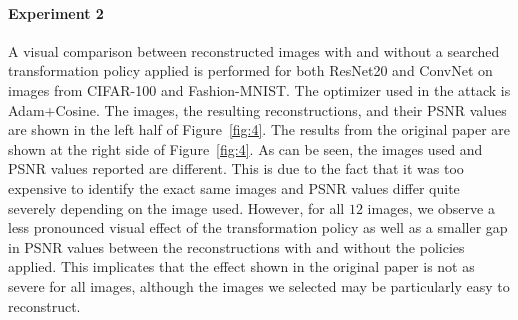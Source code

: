 \paragraph{Experiment 2} A visual comparison between reconstructed images with and without a searched transformation policy applied is performed for both ResNet20 and ConvNet on images from CIFAR-100 and Fashion-MNIST. The optimizer used in the attack is Adam+Cosine. The images, the resulting reconstructions, and their PSNR values are shown in the left half of Figure~\ref{fig:4}. The results from the original paper are shown at the right side of Figure~\ref{fig:4}. As can be seen, the images used and PSNR values reported are different. This is due to the fact that it was too expensive to identify the exact same images and PSNR values differ quite severely depending on the image used. However, for all $12$ images, we observe a less pronounced visual effect of the transformation policy as well as a smaller gap in PSNR values between the reconstructions with and without the policies applied. This implicates that the effect shown in the original paper is not as severe for all images, although the images we selected may be particularly easy to reconstruct.

